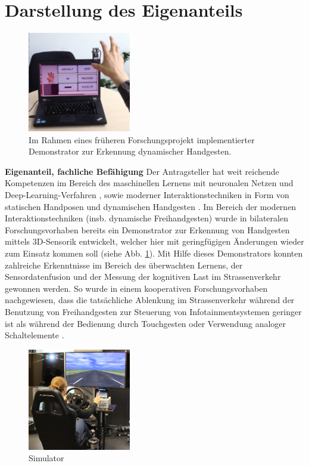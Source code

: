 \documentclass[11pt]{article}
\begin{document}
\section{Darstellung des Eigenanteils}\label{sec:eigen}
%
\begin{figure}[ht]
  \centering
  \includegraphics[width=0.4\textwidth]{images/s1.png}
  \caption{Im Rahmen eines früheren Forschungsprojekt implementierter Demonstrator zur Erkennung dynamischer Handgesten.}
  \label{fig:demo}
\end{figure}
%
\textbf{Eigenanteil, fachliche Befähigung} Der Antragsteller hat weit reichende Kompetenzen im Bereich des maschinellen Lernens mit neuronalen Netzen und Deep-Learning-Verfahren \cite{gepperth2018a,gepperth2018c,gepperth2017b}, sowie moderner Interaktionstechniken in Form von statischen Handposen und dynamischen Handgesten \cite{gepperth2017d,kopinski2016x3}. Im Bereich der modernen Interaktionstechniken (insb. dynamische Freihandgesten) wurde in bilateralen Forschungsvorhaben bereits ein Demonstrator zur Erkennung von Handgesten mittels 3D-Sensorik entwickelt, welcher hier mit geringfügigen Änderungen wieder zum Einsatz kommen soll (siehe Abb. \ref{fig:demo}). Mit Hilfe dieses Demonstrators konnten zahlreiche Erkenntnisse im Bereich des überwachten Lernens, der Sensordatenfusion und der Messung der kognitiven Last im Strassenverkehr gewonnen werden. So wurde in einem kooperativen Forschungsvorhaben nachgewiesen, dass die tatsächliche Ablenkung im Strassenverkehr während der Benutzung von Freihandgesten zur Steuerung von Infotainmentsystemen geringer ist als während der Bedienung durch Touchgesten oder Verwendung analoger Schaltelemente \cite{kopinski2016touch}.
%
\begin{figure}[ht]
  \centering
  \includegraphics[width=0.4\textwidth]{images/simulator.png}
  \caption{Simulator}
  \label{fig1}
\end{figure}
\end{document}
